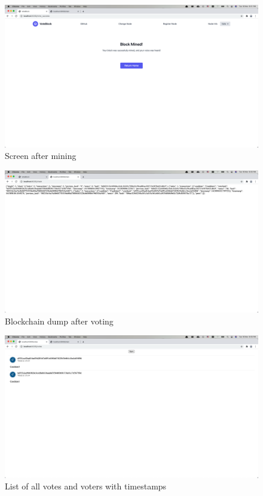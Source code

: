 \documentclass{article}
\begin{document}
    \begin{figure}[h]
        \centering
        \includegraphics[width=1\textwidth]{mining_confirmation screen.png}
        \caption{Screen after mining}
    \end{figure}
    \begin{figure}[h]
        \centering
        \includegraphics[width=1\textwidth]{chain_after_votes.png}
        \caption{Blockchain dump after voting}
    \end{figure}
    \begin{figure}[h]
        \centering
        \includegraphics[width=1\textwidth]{anon_votes.png}
        \caption{List of all votes and voters with timestamps}
    \end{figure}
\end{document}
